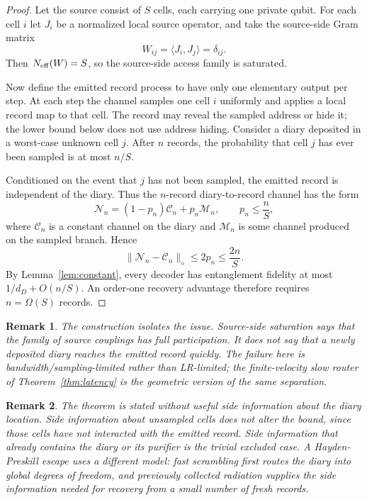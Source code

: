 \documentclass[11pt]{article}
\newtheorem{remark}{Remark}
\newcommand{\cN}{\mathcal N}
\newcommand{\cC}{\mathcal C}
\newcommand{\cM}{\mathcal M}
\begin{document}
\begin{proof}
Let the source consist of $S$ cells, each carrying one private qubit.
For each cell $i$ let $J_i$ be a normalized local source operator, and
take the source-side Gram matrix
\begin{equation}
  W_{ij}=\langle J_i,J_j\rangle=\delta_{ij}.
\end{equation}
Then $N_{\rm eff}(W)=S$, so the source-side access family is saturated.

Now define the emitted record process to have only one elementary output
per step.  At each step the channel samples one cell $i$ uniformly and
applies a local record map to that cell.  The record may reveal the
sampled address or hide it; the lower bound below does not use address
hiding.  Consider a diary deposited in a worst-case unknown cell $j$.
After $n$ records, the probability that cell $j$ has ever been sampled is
at most $n/S$.

Conditioned on the event that $j$ has not been sampled, the emitted
record is independent of the diary.  Thus the $n$-record diary-to-record
channel has the form
\begin{equation}
  \cN_n
  =
  \left(1-p_n\right)\cC_n+p_n\cM_n,
  \qquad
  p_n\le \frac{n}{S},
\end{equation}
where $\cC_n$ is a constant channel on the diary and $\cM_n$ is some
channel produced on the sampled branch.  Hence
\begin{equation}
  \lVert \cN_n-\cC_n\rVert_\diamond
  \le
  2p_n
  \le
  \frac{2n}{S}.
\end{equation}
By Lemma~\ref{lem:constant}, every decoder has entanglement fidelity at
most $1/d_D+O(n/S)$.  An order-one recovery advantage therefore requires
$n=\Omega(S)$ records.
\end{proof}

\begin{remark}
The construction isolates the issue.  Source-side saturation says that
the family of source couplings has full participation.  It does not say
that a newly deposited diary reaches the emitted record quickly.  The
failure here is bandwidth/sampling-limited rather than LR-limited; the
finite-velocity slow router of Theorem~\ref{thm:latency} is the
geometric version of the same separation.
\end{remark}

\begin{remark}
The theorem is stated without useful side information about the diary
location.  Side information about unsampled cells does not alter the
bound, since those cells have not interacted with the emitted record.
Side information that already contains the diary or its purifier is the
trivial excluded case.  A Hayden-Preskill escape uses a different model:
fast scrambling first routes the diary into global degrees of freedom,
and previously collected radiation supplies the side information needed
for recovery from a small number of fresh records.
\end{remark}
\end{document}
